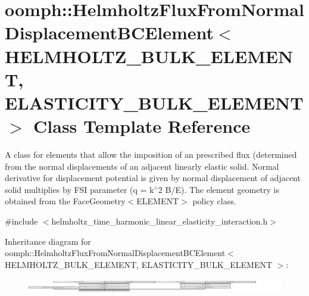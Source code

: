 \hypertarget{classoomph_1_1HelmholtzFluxFromNormalDisplacementBCElement}{}\section{oomph\+:\+:Helmholtz\+Flux\+From\+Normal\+Displacement\+B\+C\+Element$<$ H\+E\+L\+M\+H\+O\+L\+T\+Z\+\_\+\+B\+U\+L\+K\+\_\+\+E\+L\+E\+M\+E\+NT, E\+L\+A\+S\+T\+I\+C\+I\+T\+Y\+\_\+\+B\+U\+L\+K\+\_\+\+E\+L\+E\+M\+E\+NT $>$ Class Template Reference}
\label{classoomph_1_1HelmholtzFluxFromNormalDisplacementBCElement}


A class for elements that allow the imposition of an prescribed flux (determined from the normal displacements of an adjacent linearly elastic solid. Normal derivative for displacement potential is given by normal displacement of adjacent solid multiplies by F\+SI parameter (q = k$^\wedge$2 B/E). The element geometry is obtained from the Face\+Geometry$<$\+E\+L\+E\+M\+E\+N\+T$>$ policy class.  




{\ttfamily \#include $<$helmholtz\+\_\+time\+\_\+harmonic\+\_\+linear\+\_\+elasticity\+\_\+interaction.\+h$>$}

Inheritance diagram for oomph\+:\+:Helmholtz\+Flux\+From\+Normal\+Displacement\+B\+C\+Element$<$ H\+E\+L\+M\+H\+O\+L\+T\+Z\+\_\+\+B\+U\+L\+K\+\_\+\+E\+L\+E\+M\+E\+NT, E\+L\+A\+S\+T\+I\+C\+I\+T\+Y\+\_\+\+B\+U\+L\+K\+\_\+\+E\+L\+E\+M\+E\+NT $>$\+:\begin{figure}[H]
\begin{center}
\leavevmode
\includegraphics[height=0.612022cm]{classoomph_1_1HelmholtzFluxFromNormalDisplacementBCElement}
\end{center}
\end{figure}
